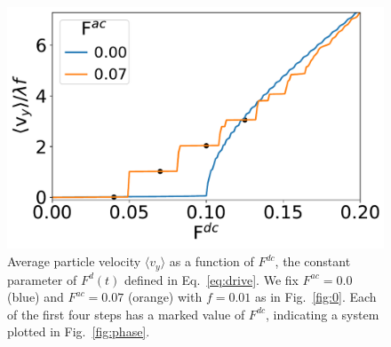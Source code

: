 \documentclass[twocolumn,preprintnumbers,amsmath,amssymb,aps,prx]{revtex4}
\begin{document}
\begin{figure} %
\centering
\includegraphics[width=\columnwidth]{fig3.pdf}
\caption{Average particle velocity  $\langle v_{y} \rangle$
  as a function of $F^{dc}$, 
  the constant parameter of $F^d(t)$ defined in Eq.~\ref{eq:drive}.
  We fix
  $F^{ac}=0.0$ (blue) and 
  $F^{ac}=0.07$ (orange) with $f = 0.01$ 
  as in Fig.~\ref{fig:0}.
  Each of the first four steps
  has a marked value of $F^{dc}$,
  indicating a system
  plotted in Fig.~\ref{fig:phase}.
}
\label{fig:1}
\end{figure}
\end{document}
